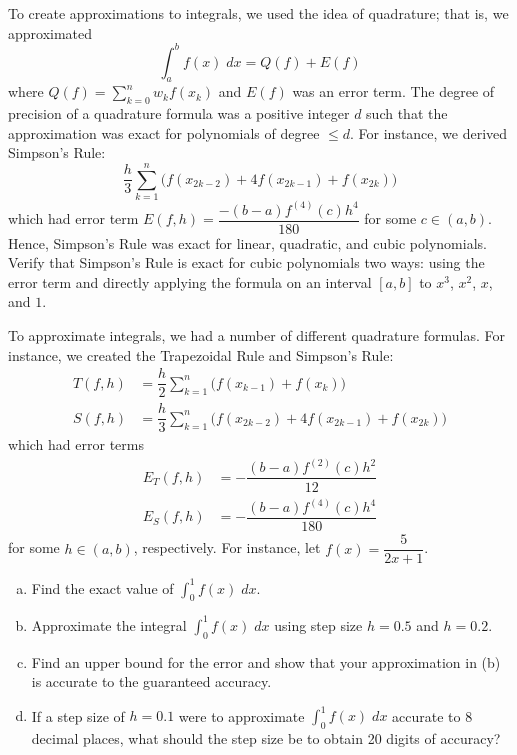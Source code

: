 \documentclass[11pt,letterpaper]{article}
\begin{document}


 To create approximations to integrals, we used the idea of quadrature; that is, we approximated 
	\[
	\int_a^b f(x) \;dx= Q(f) + E(f)
	\]
where $\displaystyle Q(f)= \sum_{k=0}^n w_k f(x_k)$ and $E(f)$ was an error term. The degree of precision of a quadrature formula was a positive integer $d$ such that the approximation was exact for polynomials of degree $\leq d$. For instance, we derived Simpson's Rule:
	\[
	\dfrac{h}{3} \sum_{k=1}^n \big( f(x_{2k-2}) + 4f(x_{2k-1}) + f(x_{2k}) \big)
	\]
which had error term $E(f, h)= \dfrac{-(b - a) f^{(4)}(c) h^4}{180}$ for some $c \in (a, b)$. Hence, Simpson's Rule was exact for linear, quadratic, and cubic polynomials. Verify that Simpson's Rule is exact for cubic polynomials two ways: using the error term and directly applying the formula on an interval $[a, b]$ to $x^3$, $x^2$, $x$, and $1$. 



\newpage



 To approximate integrals, we had a number of different quadrature formulas. For instance, we created the Trapezoidal Rule and Simpson's Rule:
	\[
	\begin{aligned}
	T(f, h)&= \dfrac{h}{2} \sum_{k=1}^n \big( f(x_{k-1}) + f(x_k) \big) \\
	S(f, h)&= \dfrac{h}{3} \sum_{k=1}^n \big( f(x_{2k-2}) + 4f(x_{2k-1}) + f(x_{2k}) \big)
	\end{aligned}
	\]
which had error terms
	\[
	\begin{aligned}
	E_T(f, h)&= -\dfrac{(b - a) f^{(2)}(c) h^2}{12} \\
	E_S(f, h)&= -\dfrac{(b - a) f^{(4)}(c) h^4}{180}
	\end{aligned}
	\]
for some $h \in (a, b)$, respectively. For instance, let $f(x)= \dfrac{5}{2x + 1}$.
	\begin{enumerate}[(a)]
	\item Find the exact value of $\displaystyle \int_0^1 f(x) \;dx$. 
	\item Approximate the integral $\int_0^1 f(x) \;dx$ using step size $h= 0.5$ and $h= 0.2$. 
	\item Find an upper bound for the error and show that your approximation in (b) is accurate to the guaranteed accuracy. 
	\item If a step size of $h= 0.1$ were to approximate $\displaystyle \int_0^1 f(x) \;dx$ accurate to 8 decimal places, what should the step size be to obtain 20 digits of accuracy?
	\end{enumerate}
\end{document}
